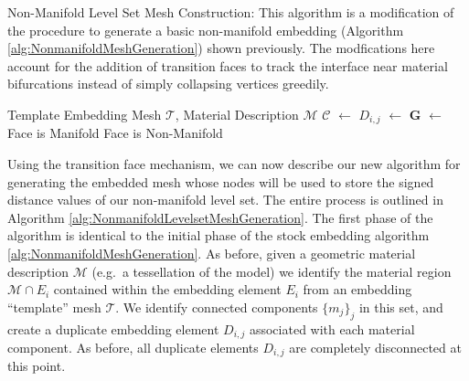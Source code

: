 \begin{algorithm}
\caption{Non-Manifold Level Set Mesh Construction: This algorithm is a
modification of the procedure to generate a basic non-manifold
embedding (Algorithm \ref{alg:NonmanifoldMeshGeneration}) shown previously. The
modfications here account for the addition of transition faces to
track the interface near material bifurcations instead of simply
collapsing vertices greedily.}
\label{alg:NonmanifoldLevelsetMeshGeneration}
\begin{algorithmic}[1]
\Require Template Embedding Mesh $\mathcal{T}$, Material Description $\mathcal{M}$
     \State $\mathcal{C}$ $\gets$ 
        \State $D_{i,j}$ $\gets$ 
     \EndFor
  \EndFor
      \State  $\mathbf{G}$ $\gets$ 
            \State {}
         \EndIf
      \EndFor
           \Comment Face is Manifold
           \State {}
        \EndIf
           \Comment Face is Non-Manifold
           \State {}
        \EndIf
      \EndFor
   \EndFor
\EndProcedure
\end{algorithmic}
\end{algorithm}


Using the transition face mechanism, we can now describe our new
algorithm for generating the embedded mesh whose nodes will be used to
store the signed distance values of our non-manifold level set. The
entire process is outlined in Algorithm
\ref{alg:NonmanifoldLevelsetMeshGeneration}. The first phase of the
algorithm is identical to the initial phase of the stock embedding
algorithm \ref{alg:NonmanifoldMeshGeneration}. As before, given a
geometric material description $\mathcal{M}$ (e.g.\ a tessellation of
the model) we identify the material region $\mathcal{M}\cap E_i$
contained within the embedding element $E_i$ from an embedding
``template'' mesh $\mathcal{T}$. We identify connected components
$\{m_j\}_j$ in this set, and create a duplicate embedding element
$D_{i,j}$ associated with each material component. As before, all
duplicate elements $D_{i,j}$ are completely disconnected at this
point.

